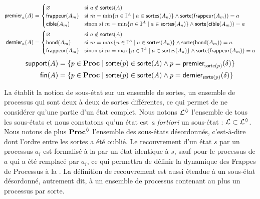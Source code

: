 \begin{definition}
  \begin{align*}
    \mathsf{premier}_{a}(A) &=
      \begin{cases}
        \varnothing & \text{si } a \notin \mathsf{sortes}(A) \\
        \mathsf{frappeur}(A_m) & \text{si } m = \min\{ n \in \mathbb{I}^{A} \mid a \in \mathsf{sortes}(A_n) \}
          \wedge \mathsf{sorte}(\mathsf{frappeur}(A_m)) = a \\
        \mathsf{cible}(A_m) & \text{sinon si } m = \min\{ n \in \mathbb{I}^{A} \mid a \in \mathsf{sortes}(A_n) \}
          \wedge \mathsf{sorte}(\mathsf{cible}(A_m)) = a
      \end{cases} \\
    \mathsf{dernier}_{a}(A) &=
      \begin{cases}
        \varnothing & \text{si } a \notin \mathsf{sortes}(A) \\
        \mathsf{bond}(A_m) & \text{si } m = \max\{ n \in \mathbb{I}^{A} \mid a \in \mathsf{sortes}(A_n) \}
          \wedge \mathsf{sorte}(\mathsf{bond}(A_m)) = a \\
        \mathsf{frappeur}(A_m) & \text{sinon si } m = \max\{ n \in \mathbb{I}^{A} \mid a \in \mathsf{sortes}(A_n) \}
          \wedge \mathsf{sorte}(\mathsf{frappeur}(A_m)) = a
      \end{cases}
  \end{align*}
  \begin{align*}
    \mathsf{support}(A) &= \{ p \in \mathbf{Proc} \mid \mathsf{sorte}(p) \in \mathsf{sorte}(A) \wedge
      p = \mathsf{premier}_{\mathsf{sorte}(p)}(\delta) \} \\
    \mathsf{fin}(A) &= \{ p \in \mathbf{Proc} \mid \mathsf{sorte}(p) \in \mathsf{sorte}(A) \wedge
      p = \mathsf{dernier}_{\mathsf{sorte}(p)}(\delta) \}
  \end{align*}
\end{definition}

La  établit la notion de sous-état sur un ensemble de sortes,
\cad un ensemble de processus qui sont deux à deux de sortes différentes,
ce qui permet de ne considérer qu'une partie d'un état complet.
Nous notons $\mathcal{L}^\lozenge$ l'ensemble de tous les sous-états et nous constatons qu'un
état est \textit{a fortiori} un sous-état : $\mathcal{L} \subset \mathcal{L}^\lozenge$.
Nous notons de plus $\mathbf{Proc}^{\lozenge}$ l'ensemble des sous-états désordonnés,
c'est-à-dire dont l'ordre entre les sortes a été oublié.
Le recouvrement d'un état $s$ par un processus $a_i$ est formalisé à la 
par un état identique à $s$, sauf pour le processus de $a$ qui a été remplacé par $a_i$,
ce qui permettra de définir la dynamique des Frappes de Processus %
à la .
La définition de recouvrement est aussi étendue à un sous-état désordonné,
autrement dit, à un ensemble de processus contenant au plus un processus par sorte.

